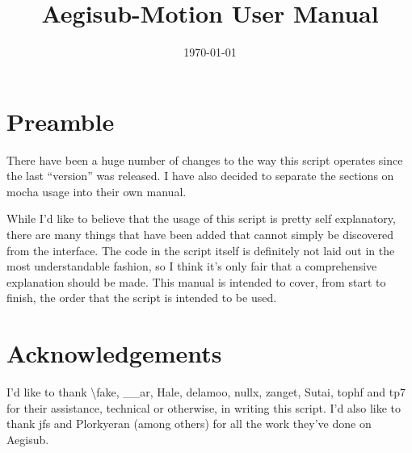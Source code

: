 ﻿\documentclass[a4paper,12pt]{article}
\title{Aegisub-Motion User Manual}
\author{}
\date{\today}
\begin{document}
	\maketitle
	\tableofcontents
	\newpage
	\section{Preamble}
  There have been a huge number of changes to the way this script operates since the last ``version'' was released. I have also decided to separate the sections on mocha usage into their own manual.
  
  While I'd like to believe that the usage of this script is pretty self explanatory, there are many things that have been added that cannot simply be discovered from the interface. The code in the script itself is definitely not laid out in the most understandable fashion, so I think it's only fair that a comprehensive explanation should be made. This manual is intended to cover, from start to finish, the order that the script is intended to be used.
  
	\section*{Acknowledgements}
	I'd like to thank \textbackslash{}fake, \_\_ar, Hale, delamoo, nullx, zanget, Sutai, tophf and tp7 for their assistance, technical or otherwise, in writing this script. I'd also like to thank jfs and Plorkyeran (among others) for all the work they've done on Aegisub.  
\end{document}
